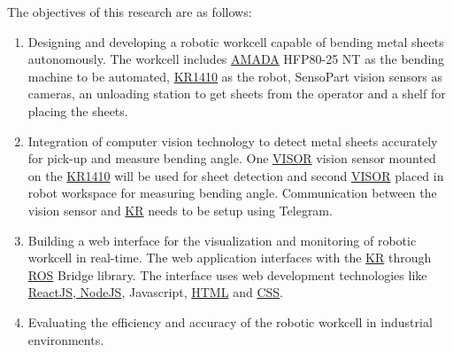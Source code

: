 The objectives of this research are as follows:
\begin{enumerate}
    \item Designing and developing a robotic workcell capable of bending metal sheets autonomously. The workcell includes \hyperref[tab:acronyms]{AMADA} HFP80-25 NT as the bending machine to be automated, \hyperref[tab:acronyms]{KR1410} as the robot, SensoPart vision sensors as cameras, an unloading station to get sheets from the operator and a shelf for placing the sheets.
    \item Integration of computer vision technology to detect metal sheets accurately for pick-up and measure bending angle. One \hyperref[tab:acronyms]{VISOR\textsuperscript{\textregistered}} vision sensor mounted on the \hyperref[tab:acronyms]{KR1410} will be used for sheet detection and second \hyperref[tab:acronyms]{VISOR\textsuperscript{\textregistered}} placed in robot workspace for measuring bending angle. Communication between the vision sensor and \hyperref[tab:acronyms]{KR} needs to be setup using Telegram.
    \item Building a web interface for the visualization and monitoring of robotic workcell in real-time. The web application interfaces with the \hyperref[tab:acronyms]{KR} through \hyperref[tab:acronyms]{ROS} Bridge library. The interface uses web development technologies like \hyperref[tab:acronyms]{ReactJS, NodeJS}, Javascript, \hyperref[tab:acronyms]{HTML} and \hyperref[tab:acronyms]{CSS}.
    \item Evaluating the efficiency and accuracy of the robotic workcell in industrial environments.
\end{enumerate}